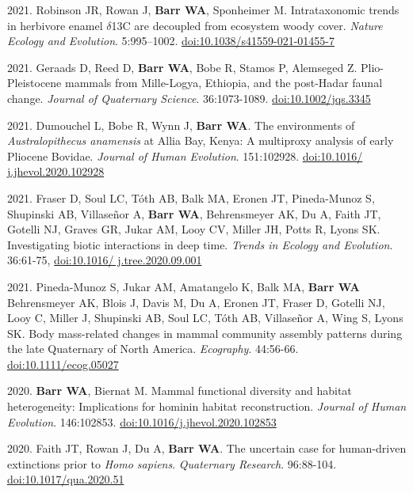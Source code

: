 \begin{etaremune}
\item 2021. Robinson JR, Rowan J,  {\bfseries Barr WA}, Sponheimer M. Intrataxonomic trends in herbivore enamel $\delta$13C are decoupled from ecosystem woody cover.  \emph{Nature Ecology and Evolution}. 5:995–1002. \href{https://dx.doi.org/10.1038/s41559-021-01455-7}{doi:10.1038/s41559-021-01455-7}

\item 2021. Geraads D, Reed D, {\bfseries Barr WA}, Bobe R, Stamos P, Alemseged Z. Plio-Pleistocene mammals from Mille-Logya, Ethiopia, and the post-Hadar faunal change. \emph{Journal of Quaternary Science}. 36:1073-1089. \href{https://doi.org/10.1002/jqs.3345}{doi:10.1002/jqs.3345}

\item 2021. Dumouchel L, Bobe R, Wynn J, {\bfseries Barr WA}. The environments of \emph{Australopithecus anamensis} at Allia Bay, Kenya: A multiproxy analysis of early Pliocene Bovidae. \emph{Journal of Human Evolution}. 151:102928. \href{https://doi.org/10.1016/j.jhevol.2020.102928}{doi:10.1016/ j.jhevol.2020.102928}

\item 2021. Fraser D, Soul LC, Tóth AB, Balk MA, Eronen JT, Pineda-Munoz S, Shupinski AB, Villaseñor A, {\bfseries Barr WA}, Behrensmeyer AK, Du A, Faith JT, Gotelli NJ, Graves GR, Jukar AM, Looy CV, Miller JH, Potts R, Lyons SK. Investigating biotic interactions in deep time. \emph{Trends in Ecology and Evolution}. 36:61-75, \href{https://doi.org/10.1016/j.tree.2020.09.001}{doi:10.1016/ j.tree.2020.09.001} 

\item 2021. Pineda-Munoz S, Jukar AM, Amatangelo K, Balk MA, {\bfseries Barr WA} Behrensmeyer AK, Blois J, Davis M, Du A, Eronen JT, Fraser D, Gotelli NJ, Looy C, Miller J, Shupinski AB, Soul LC, Tóth AB, Villaseñor A, Wing S, Lyons SK. Body mass-related changes in mammal community assembly patterns during the late Quaternary of North America. \emph{Ecography}. 44:56-66. \href{https://dx.doi.org/10.1111/ecog.05027}{doi:10.1111/ecog.05027}



\item 2020. {\bfseries Barr WA}, Biernat M. Mammal functional diversity and habitat heterogeneity: Implications for hominin habitat reconstruction. \emph{Journal of Human Evolution}. 146:102853. \href{https://dx.doi.org/10.1016/j.jhevol.2020.102853}{doi:10.1016/j.jhevol.2020.102853}

\item 2020. Faith JT, Rowan J, Du A, {\bfseries Barr WA}. The uncertain case for human-driven extinctions prior to \emph{Homo sapiens}. \emph{Quaternary Research}. 96:88-104. \href{https://dx.doi.org/10.1017/qua.2020.51}{doi:10.1017/qua.2020.51}


\end{etaremune}
